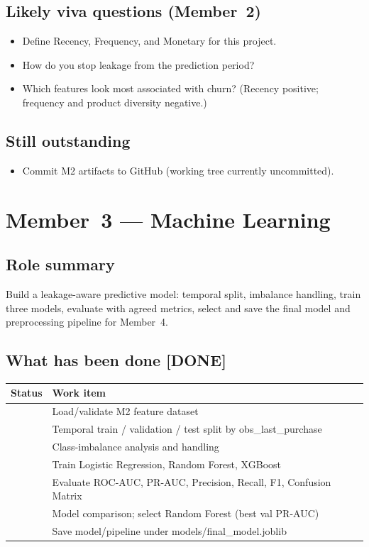 \documentclass[11pt,a4paper]{article}
\newcommand{\done}{[DONE]}
\renewcommand{\texttt}[1]{#1}
\begin{document}
\subsection{Likely viva questions (Member~2)}
\begin{itemize}
  \item Define Recency, Frequency, and Monetary for this project.
  \item How do you stop leakage from the prediction period?
  \item Which features look most associated with churn?
        (Recency positive; frequency and product diversity negative.)
\end{itemize}

\subsection{Still outstanding}
\begin{itemize}
  \item Commit M2 artifacts to GitHub (working tree currently uncommitted).
\end{itemize}

\newpage
\section{Member~3 --- Machine Learning}
\label{sec:m3}

\subsection{Role summary}
Build a leakage-aware predictive model: temporal split, imbalance handling,
train three models, evaluate with agreed metrics, select and save the final
model and preprocessing pipeline for Member~4.

\subsection{What has been done \done{}}
\begin{tabular}{|p{}|p{}|}
\hline
\textbf{Status} & \textbf{Work item} \\
\hline
\done{} & Load/validate M2 feature dataset \\
\hline
\done{} & Temporal train / validation / test split by \texttt{obs\_last\_purchase} \\
\hline
\done{} & Class-imbalance analysis and handling \\
\hline
\done{} & Train Logistic Regression, Random Forest, XGBoost \\
\hline
\done{} & Evaluate ROC-AUC, PR-AUC, Precision, Recall, F1, Confusion Matrix \\
\hline
\done{} & Model comparison; select Random Forest (best val PR-AUC) \\
\hline
\done{} & Save model/pipeline under \texttt{models/final\_model.joblib} \\
\hline
\end{tabular}
\end{document}
